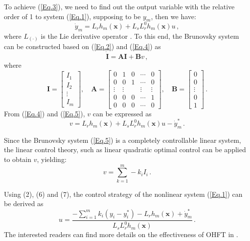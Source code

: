 \documentclass[journal]{IEEEtran}
\begin{document}
To achieve (\ref{Eq.3}), we need to find out the
output variable with the relative order of 1 to system (\ref{Eq.1}), supposing to be $y_m$, then we have:
\begin{equation}
  \Dot{y}_m=L_r{h}_m(\bm{x}) +
  L_s{L_{r}^0}{h}_m(\bm{x})u \, ,
  \label{Eq.4}
\end{equation}
where $L_{(\cdot)}$ is the Lie derivative operator \cite{Reithmeier1990Nonlinear}. To this end, the Brunovsky system can be constructed based on (\ref{Eq.2}) and (\ref{Eq.4}) as
%
\begin{equation}
  \Dot{\bm{I}} = \bm{AI} + \bm{B}v \, ,
  \label{Eq.5}
\end{equation}
where
\begin{equation*}
  \bm{I}=\begin{bmatrix} I_1\\I_2\\\vdots\\I_m \end{bmatrix}, \quad 
  \bm{A}=\begin{bmatrix}0&1&0&\cdots&0\\0& 0& 1&\cdots& 0\\ \vdots&
  \vdots& & \vdots& \vdots\\0& 0& 0& \cdots& 1\\0& 0& 0& \cdots&
  0 \end{bmatrix}, \quad \bm{B}=\begin{bmatrix}0\\0\\
  \vdots\\0\\1 \end{bmatrix} \, .
\end{equation*}
From (\ref{Eq.4}) and (\ref{Eq.5}), $v$ can be expressed as
%
\begin{equation}
  v = L_{r}{h}_m(\bm{x}) +
  L_{s}{L_{r}^0} {h}_m(\bm{x})u-\Dot{y}^{*}_{m} \, . 
  \label{Eq.6}
\end{equation}

Since the Brunovsky system (\ref{Eq.5}) is a completely controllable linear system, the linear control theory, such as linear quadratic optimal control \cite{Perez2018Linear} can be applied to obtain $v$, yielding:
%
\begin{equation}
  v=\sum_{k=1}^m-k_iI_i \, .
  \label{Eq.7}
\end{equation}

Using (2), (6) and (7), the control strategy of the nonlinear system (\ref{Eq.1}) can be derived as
%
\begin{equation}
  u=\frac{-\sum_{i=1}^m k_i(y_i-y^{*}_{i})-L_{{r}}h_m(\bm{x}) +
    \Dot{y}^{*}_{m}}{L_{{s}}L_{{r}}^0h_m(\bm{x})} \, .
  \label{Eq.8}
\end{equation}
The interested readers can find more details on the effectiveness of OHFT in \cite{Hui2008Nonlinear}.
\end{document}
